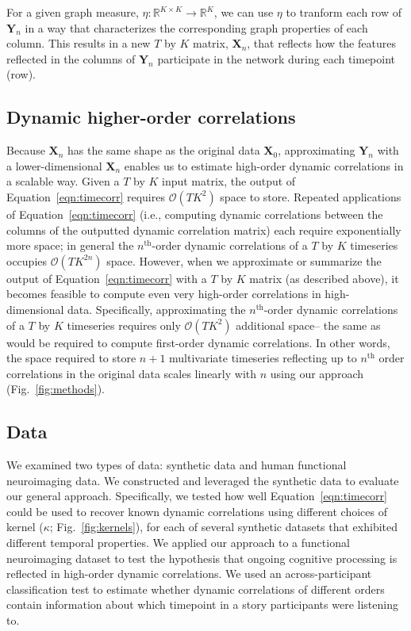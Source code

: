 \documentclass[english]{article}
\begin{document}
For a given graph measure,
$\eta: \mathbb{R}^{K \times K} \rightarrow \mathbb{R}^K$, we can use
$\eta$ to tranform each row of $\mathbf{Y}_n$ in a way that
characterizes the corresponding graph properties of each
column.  This results in a new $T$ by $K$ matrix, $\mathbf{X}_n$, that
reflects how the features reflected in the columns of $\mathbf{Y}_n$
participate in the network during each timepoint (row).


\subsection*{Dynamic higher-order correlations}

Because $\mathbf{X}_n$ has the same shape as the original data
$\mathbf{X}_0$, approximating $\mathbf{Y}_n$ with a lower-dimensional
$\mathbf{X}_n$ enables us to estimate high-order dynamic correlations
in a scalable way.  Given a $T$ by $K$ input matrix, the output of
Equation~\ref{eqn:timecorr} requires $\mathcal{O}(TK^2)$ space to
store.  Repeated applications of Equation~\ref{eqn:timecorr} (i.e.,
computing dynamic correlations between the columns of the outputted
dynamic correlation matrix) each require exponentially more space; in
general the $n^\mathrm{th}$-order dynamic correlations of a $T$ by $K$
timeseries occupies $\mathcal{O}(TK^{2n})$ space.  However, when we
approximate or summarize the output of Equation~\ref{eqn:timecorr} with a $T$ by
$K$ matrix (as described above), it becomes feasible to compute even
very high-order correlations in high-dimensional data.  Specifically,
approximating the $n^\mathrm{th}$-order dynamic correlations of a $T$
by $K$ timeseries requires only $\mathcal{O}(TK^2)$ additional space--
the same as would be required to compute first-order dynamic
correlations. In other words, the space required to store $n+1$
multivariate timeseries reflecting up to $n^\mathrm{th}$ order
correlations in the original data scales linearly with $n$ using our
approach (Fig.~\ref{fig:methods}).

\subsection*{Data}
We examined two types of data: synthetic data and human functional
neuroimaging data.  We constructed and leveraged the synthetic data to
evaluate our general approach.  Specifically, we tested how well
Equation~\ref{eqn:timecorr} could be used to recover known dynamic
correlations using different choices of kernel ($\kappa$;
Fig.~\ref{fig:kernels}), for each of several synthetic datasets that
exhibited different temporal properties.  We applied our approach to a
functional neuroimaging dataset to test the hypothesis that ongoing
cognitive processing is reflected in high-order dynamic correlations.
We used an across-participant classification test to estimate whether
dynamic correlations of different orders contain information about
which timepoint in a story participants were listening to.
\end{document}
